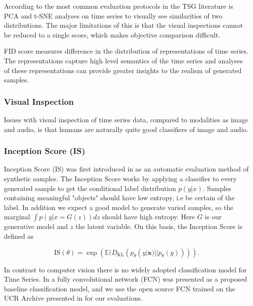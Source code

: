 \documentclass[../../thesis.tex]{subfiles}
\begin{document}
According to \cite{TimeVQVAE} the most common evaluation protocols in the TSG literature is PCA and t-SNE analyses on time series to visually see similarities of two distributions. The major limitations of this is that the visual inspections cannot be reduced to a single score, which makes objective comparison difficult. \newline


FID score measures difference in the distribution of representations of time series. The representations capture high level semantics of the time series and analyses of these representations can provide greater insights to the realism of generated samples. \newline





\subsubsection{Visual Inspection}

Issues with visual inspection of time series data, compared to modalities as image and audio, is that humans are naturally quite good classifiers of image and audio.


\subsubsection{Inception Score (IS)}
Inception Score (IS) was first introduced in \cite{salimans2016improved} as an automatic evaluation method of synthetic samples.\newline
The Inception Score works by applying a classifier to every generated sample to get the conditional label distribution $p(y|x)$. Samples containing meaningful "objects" should have low entropy, i.e be certain of the label. In addition we expect a good model to generate varied samples, so the marginal $\int p(y|x = G(z))dz$ should have high entropy. Here $G$ is our generative model and $z$ the latent variable. On this basis, the Inception Score is defined as 

\begin{equation}
    \label{IS}
    {\text{IS}}(\theta) = \exp\left( \mathbb{E}(D_{\text{KL}}(p_\theta(y|\mathbf{x}) || p_\theta(y))) \right).
\end{equation}

In contrast to computer vision there is no widely adopted classification model for Time Series. In \cite{wang2016time} a fully convolutional network (FCN) was presented as a proposed baseline classification model, and we use the open source FCN trained on the UCR Archive presented in \cite{TimeVQVAE} for our evaluations. \newline
\end{document}
